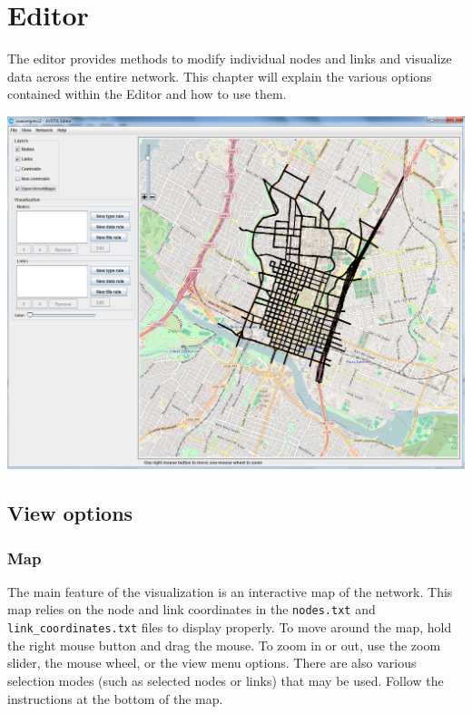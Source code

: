 \chapter{Editor}

The editor provides methods to modify individual nodes and links and visualize data across the entire network. This chapter will explain the various options contained within the Editor and how to use them.

\begin{center}
\includegraphics[width=\textwidth]{images/editor1.png}
\end{center}

\section{View options}


\subsection{Map}
The main feature of the visualization is an interactive map of the network. This map relies on the node and link coordinates in the \texttt{nodes.txt} and \texttt{link\_coordinates.txt} files to display properly. To move around the map, hold the right mouse button and drag the mouse. To zoom in or out, use the zoom slider, the mouse wheel, or the view menu options. 
%
There are also various selection modes (such as selected nodes or links) that may be used. Follow the instructions at the bottom of the map.


